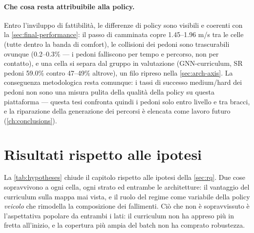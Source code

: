 \paragraph{Che cosa resta attribuibile alla policy.}
Entro l'inviluppo di fattibilità, le differenze di policy sono visibili
e coerenti con la \cref{sec:final-performance}: il passo di camminata
copre 1.45--1.96 m/s tra le celle (tutte dentro la banda di comfort),
le collisioni dei pedoni sono trascurabili ovunque (0.2--0.3\% --- i
pedoni falliscono per tempo e percorso, non per contatto), e una cella
si separa dal gruppo in valutazione (GNN-curriculum, SR pedoni 59.0\%
contro 47--49\% altrove), un filo ripreso nella \cref{sec:arch-axis}.
La conseguenza metodologica resta comunque: i tassi di successo
medium/hard dei pedoni non sono una misura pulita della qualità della
policy su questa piattaforma --- questa tesi confronta quindi i pedoni
solo entro livello e tra bracci, e la riparazione della generazione dei
percorsi è elencata come lavoro futuro (\cref{ch:conclusions}).

\section{Risultati rispetto alle ipotesi}
\label{sec:findings}

La \cref{tab:hypotheses} chiude il capitolo rispetto alle ipotesi della
\cref{sec:rq}. Due cose sopravvivono a ogni cella, ogni strato ed
entrambe le architetture: il vantaggio del curriculum sulla mappa mai
vista, e il ruolo del regime come variabile della policy \emph{veicolo}
che rimodella la composizione dei fallimenti. Ciò che non è
sopravvissuto è l'aspettativa popolare da entrambi i lati: il
curriculum non ha appreso più in fretta all'inizio, e la copertura più
ampia del batch non ha comprato robustezza.

